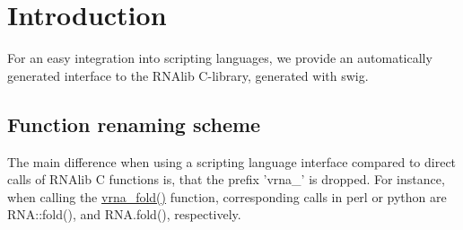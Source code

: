 \hypertarget{swig_interface_swig_intro}{}\section{Introduction}\label{swig_interface_swig_intro}
For an easy integration into scripting languages, we provide an automatically generated interface to the R\-N\-Alib C-\/library, generated with swig.\hypertarget{swig_interface_swig_renaming}{}\subsection{Function renaming scheme}\label{swig_interface_swig_renaming}
The main difference when using a scripting language interface compared to direct calls of R\-N\-Alib C functions is, that the prefix 'vrna\-\_\-' is dropped. For instance, when calling the \hyperlink{group__mfe__fold__single_gae7ca49ffb3086f145da36c964a7cec64}{vrna\-\_\-fold()} function, corresponding calls in perl or python are R\-N\-A\-::fold(), and R\-N\-A.\-fold(), respectively.

